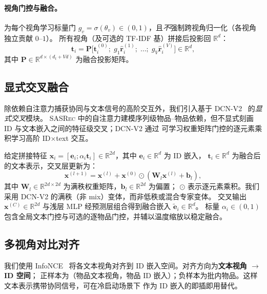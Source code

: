\documentclass[sigconf,natbib=true,anonymous]{acmart}
\newcommand{\base}{\textsc{SASRec}\xspace}
\newcommand{\tfidf}{\textsc{TF-IDF}\xspace}
\newcommand{\InfoNCE}{InfoNCE\xspace}
\begin{document}
\paragraph{视角门控与融合。}
为每个视角学习标量门 $g_v=\sigma(\theta_v)\in(0,1)$，且\emph{不}强制跨视角归一化（各视角独立贡献 $0$--$1$）。
所有视角（及可选的 \tfidf 基）拼接后投影回 $\mathbb{R}^d$：
\begin{equation}
  \mathbf{t}_i = \mathbf{P}\Big[\mathbf{t}_i^{(0)};\; g_1\hat{\mathbf{r}}_i^{(1)};\; \dots;\; g_V\hat{\mathbf{r}}_i^{(V)}\Big] \in \mathbb{R}^d,
\end{equation}
其中 $\mathbf{P} \in \mathbb{R}^{d \times (d_t + Vd)}$ 为融合投影矩阵。

\subsection{显式交叉融合}\label{sec:cross}
除依赖自注意力捕获协同与文本信号的高阶交互外，我们引入基于 DCN-V2~\cite{wang2021dcnv2} 的\emph{显式交叉}模块。
\base 中的自注意力建模序列级物品--物品依赖，但不显式刻画 ID 与文本嵌入之间的特征级交叉；DCN-V2 通过
可学习权重矩阵门控的逐元素乘积学习高阶 ID$\times$text 交互。

给定拼接特征 $\mathbf{x}_i=[\mathbf{e}_i;\alpha_i \mathbf{t}_i] \in \mathbb{R}^{2d}$，其中 $\mathbf{e}_i \in \mathbb{R}^d$ 为 ID 嵌入，
$\mathbf{t}_i \in \mathbb{R}^d$ 为融合后的文本表示，交叉层更新为：
\begin{equation}
  \mathbf{x}^{(l+1)} = \mathbf{x}^{(l)} + \mathbf{x}^{(0)} \odot (\mathbf{W}_l\mathbf{x}^{(l)} + \mathbf{b}_l),
\end{equation}
其中 $\mathbf{W}_l \in \mathbb{R}^{2d \times 2d}$ 为满秩权重矩阵，$\mathbf{b}_l \in \mathbb{R}^{2d}$ 为偏置；
$\odot$ 表示逐元素乘积。我们采用 DCN-V2 的满秩（非 mix）变体，而非低秩或混合专家变体。
交叉输出 $\mathbf{x}^{(C)} \in \mathbb{R}^{2d}$ 与浅层 MLP 经预测层组合得到融合嵌入 $\tilde{\mathbf{e}}_i \in \mathbb{R}^d$。
标量 $\alpha_i \in (0,1)$ 包含全局文本门控与可选的逐物品门控，并辅以温度缩放以稳定融合。

\subsection{多视角对比对齐}\label{sec:align}
我们使用 \InfoNCE~\cite{oord2018cpc} 将各文本视角对齐到 ID 嵌入空间。对齐方向为\textbf{文本视角 $\to$ ID 空间}；
正样本为（物品文本视角，物品 ID 嵌入）；负样本为批内物品。这样文本表示携带协同信号，可在冷启动场景下
作为 ID 嵌入的即插即用替代。
\end{document}
